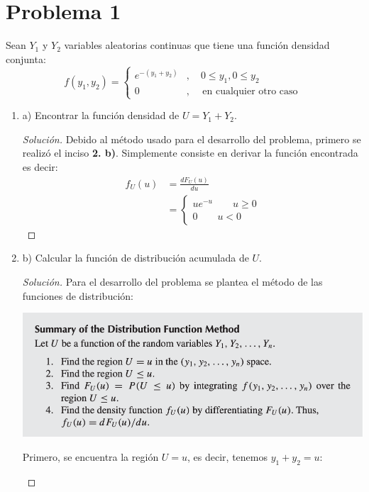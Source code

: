 \documentclass[a4paper,12pt]{article}
\newenvironment{solution}
  {\renewcommand\qedsymbol{$\blacksquare$}\begin{proof}[Solución]}
  {\end{proof}}
\begin{document}
\section{Problema 1} Sean $Y_1$ y $Y_2$ variables aleatorias continuas que tiene una función densidad conjunta:
$$
f\left(y_{1}, y_{2}\right)=\left\{\begin{array}{ll}
e^{-\left(y_{1}+y_{2}\right)} & , \quad 0 \leq y_{1}, 0 \leq y_{2} \\
0 & , \quad \text { en cualquier otro caso }
\end{array}\right.
$$
\begin{enumerate}
    \item a) Encontrar la función densidad de $U=Y_{1}+Y_{2}$.
    \begin{solution}
    Debido al método usado para el desarrollo del problema, primero se realizó el inciso \textbf{2. b)}. Simplemente consiste en derivar la función encontrada es decir: 
    \begin{align}
        f_U(u)&=\frac{dF_U(u)}{du}\\
              &= \begin{cases}ue^{-u}\qquad u\geq 0\\ 0 \qquad u<0\end{cases}
    \end{align}
    \end{solution}
    \item b) Calcular la función de distribución acumulada de $U$.
    \begin{solution}
    Para el desarrollo del problema se plantea el método de las funciones de distribución: \begin{center}
        \includegraphics[scale=0.3]{images/primero.png}
    \end{center}
    Primero, se encuentra la región $U=u$, es decir, tenemos $y_1+y_2=u$: 
    \begin{center}
        



\end{center}
\end{solution}
\end{enumerate}
\end{document}
